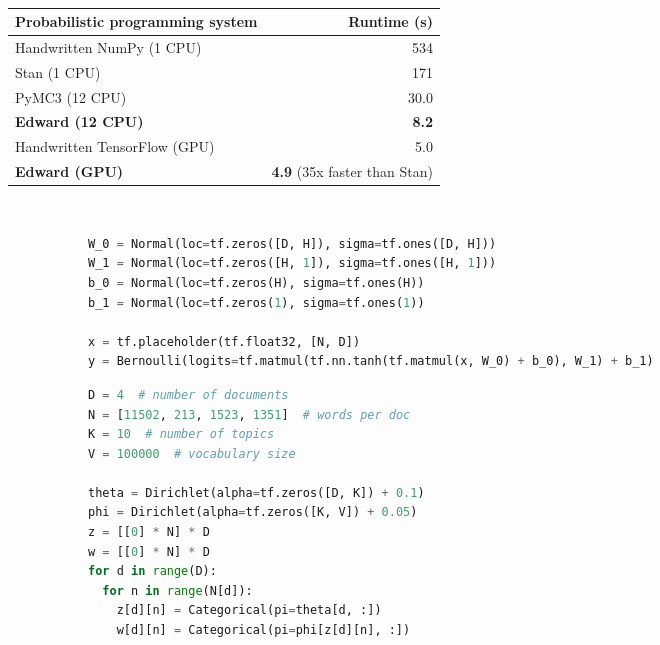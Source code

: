 \documentclass{article} %
\begin{document}
\begin{table}[t]
\centering
\begin{tabular}{lr}
\toprule
Probabilistic programming system & Runtime (s)
\\
\midrule
Handwritten NumPy (1 CPU) & 534 \\
Stan (1 CPU) \gray{\small [Carpenter+ 2016]} & 171 \\
PyMC3 (12 CPU) \gray{\small [Salvatier+ 2015]} & 30.0 \\
\textbf{Edward (12 CPU)} & \textbf{8.2} \\
Handwritten TensorFlow (GPU) & 5.0 \\
\textbf{Edward (GPU)} & \textbf{4.9} (35x faster than Stan)\\
\bottomrule
\end{tabular}
\caption{}
\end{table}

\begin{figure}[t]
\begin{subfigure}{\columnwidth}
  \centering
  
\end{subfigure}%
\\
\begin{subfigure}{\columnwidth}
\begin{lstlisting}[language=python]
W_0 = Normal(loc=tf.zeros([D, H]), sigma=tf.ones([D, H]))
W_1 = Normal(loc=tf.zeros([H, 1]), sigma=tf.ones([H, 1]))
b_0 = Normal(loc=tf.zeros(H), sigma=tf.ones(H))
b_1 = Normal(loc=tf.zeros(1), sigma=tf.ones(1))

x = tf.placeholder(tf.float32, [N, D])
y = Bernoulli(logits=tf.matmul(tf.nn.tanh(tf.matmul(x, W_0) + b_0), W_1) + b_1)
\end{lstlisting}
\end{subfigure}
\caption{}
\end{figure}

\begin{figure}[t]
\begin{subfigure}{0.45\columnwidth}
  \centering
  
\end{subfigure}%
\begin{subfigure}{0.55\columnwidth}
\begin{lstlisting}[language=python]
D = 4  # number of documents
N = [11502, 213, 1523, 1351]  # words per doc
K = 10  # number of topics
V = 100000  # vocabulary size

theta = Dirichlet(alpha=tf.zeros([D, K]) + 0.1)
phi = Dirichlet(alpha=tf.zeros([K, V]) + 0.05)
z = [[0] * N] * D
w = [[0] * N] * D
for d in range(D):
  for n in range(N[d]):
    z[d][n] = Categorical(pi=theta[d, :])
    w[d][n] = Categorical(pi=phi[z[d][n], :])
\end{lstlisting}
\end{subfigure}
\caption{}
\end{figure}
\end{document}
